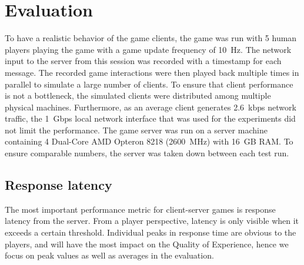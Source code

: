 \section{Evaluation}\label{sec:eval}

  
To have a realistic behavior of the game clients, the game was run
with 5 human players playing the game with a game update frequency of
10~Hz. The network input to the server from this session was recorded
with a timestamp for each message. The recorded game interactions were
then played back multiple times in parallel to simulate a large number
of clients. To ensure that client performance is not a bottleneck, the
simulated clients were distributed among multiple physical
machines. Furthermore, as an average client generates 2.6~kbps network
traffic, the 1~Gbps local network interface that was used for the
experiments did not limit the performance. The game server was run on a
server machine containing 4 Dual-Core AMD Opteron 8218 (2600~MHz) with
16~GB RAM. To ensure comparable numbers, the server was taken down
between each test run.

\subsection{Response latency}
%
%
The most important performance metric for client-server games is response latency from the server. From a player perspective, latency is only visible when it exceeds a certain threshold. Individual peaks in response time are obvious to the players, and will have the most impact on the Quality of Experience, hence we focus on peak values as well as averages in the evaluation.

